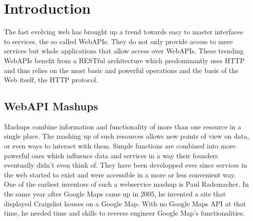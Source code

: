 \chapter{Introduction}

The fast evolving web has brought up a trend towards easy to master interfaces to services, the so called WebAPIs.
They do not only provide access to mere services but whole applications that allow access over WebAPIs.
These trending WebAPIs benefit from a RESTful architecture which predominantly uses HTTP and thus relies on the most basic and powerful operations and the basis of the Web itself, the HTTP protocol. 












\section{WebAPI Mashups}
Mashups combine information and functionality of more than one resource in a single place.
The mashing up of such resources allows new points of view on data, or even ways to interact with them.
Simple functions are combined into more powerful ones which influence data and services in a way their founders eventually didn't even think of.
They have been developped ever since services in the web started to exist and were accessible in a more or less convenient way.
One of the earliest inventors of such a webservice mashup is Paul Rademacher.
In the same year after Google Maps came up in 2005, he invented a site\cite{wwwRademacherOne,wwwRademacherTwo} that displayed Craigslist houses on a Google Map.
With no Google Maps API at that time, he needed time and skills to reverse engineer Google Map's functionalities.


